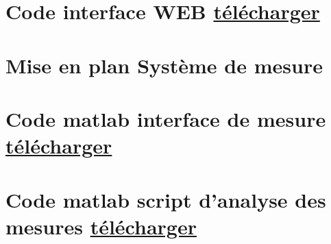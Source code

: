 \newpage
\section[Code interface WEB]{Code interface WEB \href{https://1drv.ms/u/s!Altwa7Vt0GlIj556q9wAVZ4g44uetA?e=RitRET}{télécharger}}\label{code:interface_web}


\newpage
\section[Mise en plan Système de mesure]{Mise en plan Système de mesure}\label{mise_en_plan_systeme_spray}

\begin{figure}[H]
    \centering
    
\end{figure}

\newpage
\section[Code matlab interface de mesure]{Code matlab interface de mesure \href{https://1drv.ms/f/s!Altwa7Vt0GlIj58Nf_KP9MAyebNbUA?e=5ZQHAe}{télécharger}}\label{code:interface_mesure_matlab}


\newpage
\section[Code matlab script d'analyse des mesures]{Code matlab script d'analyse des mesures \href{https://1drv.ms/f/s!Altwa7Vt0GlIjqIo0fPcbU9wN-YUhg?e=IFhokF}{télécharger}}\label{code:script_mesure_matlab}

